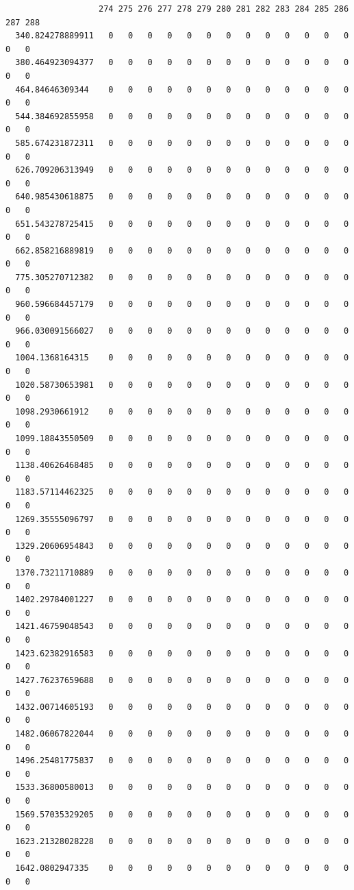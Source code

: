 \documentclass[
  letterpaper,
  DIV=11,
  numbers=noendperiod]{scrartcl}
\begin{document}
\begin{verbatim}
                   274 275 276 277 278 279 280 281 282 283 284 285 286 287 288
  340.824278889911   0   0   0   0   0   0   0   0   0   0   0   0   0   0   0
  380.464923094377   0   0   0   0   0   0   0   0   0   0   0   0   0   0   0
  464.84646309344    0   0   0   0   0   0   0   0   0   0   0   0   0   0   0
  544.384692855958   0   0   0   0   0   0   0   0   0   0   0   0   0   0   0
  585.674231872311   0   0   0   0   0   0   0   0   0   0   0   0   0   0   0
  626.709206313949   0   0   0   0   0   0   0   0   0   0   0   0   0   0   0
  640.985430618875   0   0   0   0   0   0   0   0   0   0   0   0   0   0   0
  651.543278725415   0   0   0   0   0   0   0   0   0   0   0   0   0   0   0
  662.858216889819   0   0   0   0   0   0   0   0   0   0   0   0   0   0   0
  775.305270712382   0   0   0   0   0   0   0   0   0   0   0   0   0   0   0
  960.596684457179   0   0   0   0   0   0   0   0   0   0   0   0   0   0   0
  966.030091566027   0   0   0   0   0   0   0   0   0   0   0   0   0   0   0
  1004.1368164315    0   0   0   0   0   0   0   0   0   0   0   0   0   0   0
  1020.58730653981   0   0   0   0   0   0   0   0   0   0   0   0   0   0   0
  1098.2930661912    0   0   0   0   0   0   0   0   0   0   0   0   0   0   0
  1099.18843550509   0   0   0   0   0   0   0   0   0   0   0   0   0   0   0
  1138.40626468485   0   0   0   0   0   0   0   0   0   0   0   0   0   0   0
  1183.57114462325   0   0   0   0   0   0   0   0   0   0   0   0   0   0   0
  1269.35555096797   0   0   0   0   0   0   0   0   0   0   0   0   0   0   0
  1329.20606954843   0   0   0   0   0   0   0   0   0   0   0   0   0   0   0
  1370.73211710889   0   0   0   0   0   0   0   0   0   0   0   0   0   0   0
  1402.29784001227   0   0   0   0   0   0   0   0   0   0   0   0   0   0   0
  1421.46759048543   0   0   0   0   0   0   0   0   0   0   0   0   0   0   0
  1423.62382916583   0   0   0   0   0   0   0   0   0   0   0   0   0   0   0
  1427.76237659688   0   0   0   0   0   0   0   0   0   0   0   0   0   0   0
  1432.00714605193   0   0   0   0   0   0   0   0   0   0   0   0   0   0   0
  1482.06067822044   0   0   0   0   0   0   0   0   0   0   0   0   0   0   0
  1496.25481775837   0   0   0   0   0   0   0   0   0   0   0   0   0   0   0
  1533.36800580013   0   0   0   0   0   0   0   0   0   0   0   0   0   0   0
  1569.57035329205   0   0   0   0   0   0   0   0   0   0   0   0   0   0   0
  1623.21328028228   0   0   0   0   0   0   0   0   0   0   0   0   0   0   0
  1642.0802947335    0   0   0   0   0   0   0   0   0   0   0   0   0   0   0

\end{verbatim}
\end{document}
